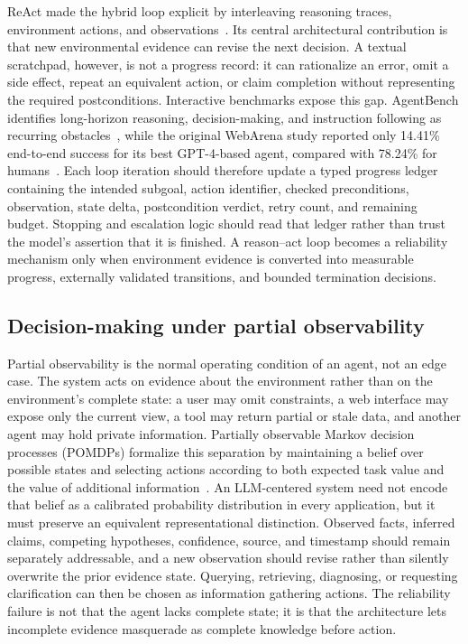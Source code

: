 ReAct made the hybrid loop explicit by interleaving reasoning traces, environment actions, and observations~\cite{yao2023react}. Its central architectural contribution is that new environmental evidence can revise the next decision. A textual scratchpad, however, is not a progress record: it can rationalize an error, omit a side effect, repeat an equivalent action, or claim completion without representing the required postconditions. Interactive benchmarks expose this gap. AgentBench identifies long-horizon reasoning, decision-making, and instruction following as recurring obstacles~\cite{liu2024agentbench}, while the original WebArena study reported only 14.41\% end-to-end success for its best GPT-4-based agent, compared with 78.24\% for humans~\cite{zhou2024webarena}. Each loop iteration should therefore update a typed progress ledger containing the intended subgoal, action identifier, checked preconditions, observation, state delta, postcondition verdict, retry count, and remaining budget. Stopping and escalation logic should read that ledger rather than trust the model's assertion that it is finished. A reason--act loop becomes a reliability mechanism only when environment evidence is converted into measurable progress, externally validated transitions, and bounded termination decisions.

\subsection{Decision-making under partial observability}

Partial observability is the normal operating condition of an agent, not an edge case. The system acts on evidence about the environment rather than on the environment's complete state: a user may omit constraints, a web interface may expose only the current view, a tool may return partial or stale data, and another agent may hold private information. Partially observable Markov decision processes (POMDPs) formalize this separation by maintaining a belief over possible states and selecting actions according to both expected task value and the value of additional information~\cite{kaelbling1998pomdp}. An LLM-centered system need not encode that belief as a calibrated probability distribution in every application, but it must preserve an equivalent representational distinction. Observed facts, inferred claims, competing hypotheses, confidence, source, and timestamp should remain separately addressable, and a new observation should revise rather than silently overwrite the prior evidence state. Querying, retrieving, diagnosing, or requesting clarification can then be chosen as information gathering actions. The reliability failure is not that the agent lacks complete state; it is that the architecture lets incomplete evidence masquerade as complete knowledge before action.

